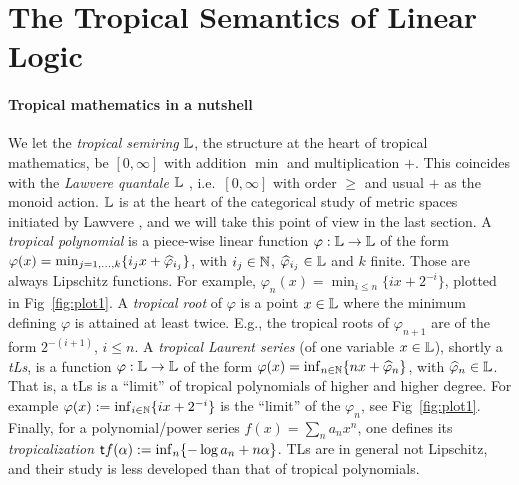 \documentclass[submission,%
]{eptcs}
\begin{document}
\section{The Tropical Semantics of Linear Logic }

\paragraph{Tropical mathematics in a nutshell}

We let the \emph{tropical semiring}  $\mathbb{L}$, the structure at the heart of tropical mathematics, be $[0,\infty]$ with addition $\min$ and multiplication $+$.
This coincides with the \emph{Lawvere quantale} $\mathbb{L}$ \cite{Hofmann2014, Stubbe2014}, i.e.\ $[0,\infty]$ with order $\geq$ and usual $+$ as the monoid action. 
$\mathbb{L}$ is at the heart of the categorical study of metric spaces initiated by Lawvere \cite{Lawvere1973}, and we will take this point of view in the last section.
A \emph{tropical polynomial} is a piece-wise linear function $\varphi:\mathbb{L}\to \mathbb{L}$ of the form $\varphi(x)=\min_{j=1,\dots,k}\{i_{j}x+\widehat{\varphi}_{i_{j}}\}$, with $i_{j}\in\mathbb{N}$, $\widehat{\varphi}_{i_{j}}\in\mathbb{L}$ and $k$ finite.
Those are always Lipschitz functions.
For example, $\varphi_{n}(x)=\min_{i\leq n}\{ix+2^{-i}\}$, plotted in Fig~\ref{fig:plot1}.
A \emph{tropical root} of $\varphi$ is a point $x\in \mathbb{L}$ where the minimum defining $\varphi$ is attained at least twice. %
E.g., the tropical roots of $\varphi_{n+1}$ are of the form $2^{-(i+1)}$, $i \leq n$.
A \emph{tropical Laurent series} (of one variable $x\in\mathbb{L}$), shortly a \emph{tLs}, is a function $\varphi:\mathbb{L}\to \mathbb{L}$ of the form $\varphi(x)=\inf_{n\in\mathbb{N}}\{nx+\widehat{\varphi}_{n}\}$, with $\widehat{\varphi}_{n}\in\mathbb{L}$.
That is, a tLs is a ``limit'' of tropical polynomials of higher and higher degree.
For example $\varphi(x):=\inf_{i\in\mathbb{N}}\{ix+2^{-i}\}$ %
is the ``limit'' of the $\varphi_{n}$, see Fig~\ref{fig:plot1}. %
Finally, for a polynomial/power series $f(x)=\sum_n a_nx^n$, one defines its \emph{tropicalization} $\mathsf{t} f(\alpha):=\inf_n\{-\log a_n+n\alpha\}$.
TLs are in general not Lipschitz, and their study is less developed than that of tropical polynomials.
\end{document}
